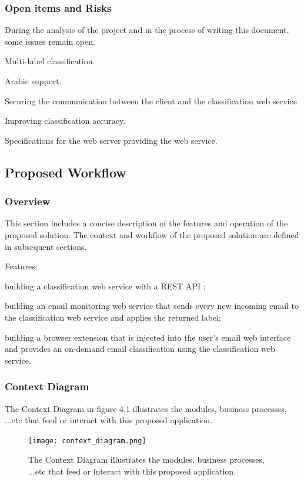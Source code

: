 \subsubsection{Open items and Risks}
During the analysis of the project and in the process of writing this document, 
some issues remain open.
\begin{my_itemize}
  \item Multi-label classification.
  \item Arabic support.
  \item Securing the communication between the client and the classification web service.
  \item Improving classification accuracy.
  \item Specifications for the web server providing the web service.
\end{my_itemize}


\subsection{Proposed Workflow}
\subsubsection{Overview}
This section includes a concise description of the features and operation of the 
proposed solution. The context and workflow of the proposed solution are defined in subsequent sections.

Features:
\begin{my_itemize}
  \item building a classification web service with a REST API \cite{REST};
  \item building an email monitoring web service that sends every new incoming
  email to the classification web service and applies the returned label;
  \item building a browser extension that is injected into the user's email web interface
  and provides an on-demand email classification using the classification web service.
\end{my_itemize}

\subsubsection{Context Diagram}
The Context Diagram in figure 4.1 illustrates the modules, business processes, ...etc that feed 
or interact with this proposed application.
\begin{figure}[H]
  \centering
  \texttt{[image: context\_diagram.png]}
  \caption[The Context Diagram illustrates the modules, business processes, ...etc that feed 
or interact with this proposed application.] {The Context Diagram illustrates the modules, business processes, ...etc that feed 
or interact with this proposed application.}
\end{figure}


